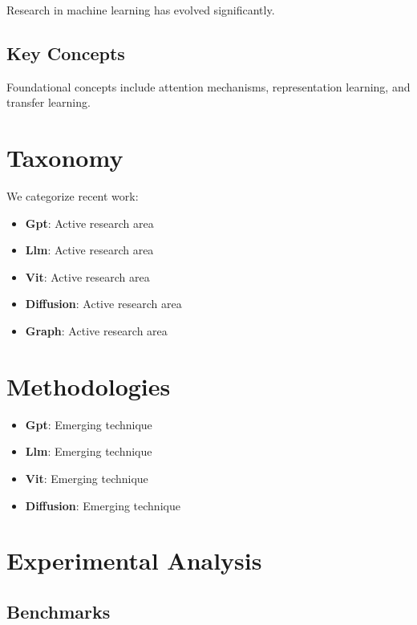 \documentclass[11pt,a4paper]{article}
\begin{document}
Research in machine learning has evolved significantly.

\subsection{Key Concepts}

Foundational concepts include attention mechanisms, representation learning, and transfer learning.



\section{Taxonomy}

We categorize recent work:

\begin{itemize}
    \item \textbf{Gpt}: Active research area
    \item \textbf{Llm}: Active research area
    \item \textbf{Vit}: Active research area
    \item \textbf{Diffusion}: Active research area
    \item \textbf{Graph}: Active research area
\end{itemize}



\section{Methodologies}

\begin{itemize}
    \item \textbf{Gpt}: Emerging technique
    \item \textbf{Llm}: Emerging technique
    \item \textbf{Vit}: Emerging technique
    \item \textbf{Diffusion}: Emerging technique
\end{itemize}



\section{{Experimental Analysis}}

\subsection{{Benchmarks}}
\end{document}
